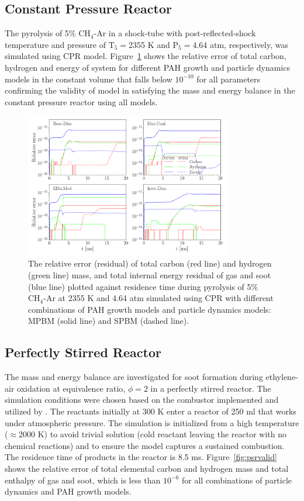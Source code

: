 \subsection{Constant Pressure Reactor}

The pyrolysis of 5\% $\mathrm{CH_4}$-Ar in a shock-tube with post-reflected-shock temperature and pressure of $\mathrm{T_5}=$2355 K and $\mathrm{P_5}=$4.64 atm, respectively, was simulated using CPR model. Figure~\ref{fig:cprvalid} shows the relative error of total carbon, hydrogen and energy of system for different PAH growth and particle dynamics models in the constant volume that falls below $\mathrm{10^{-10}}$ for all parameters confirming the validity of model in satisfying the mass and energy balance in the constant pressure reactor using all models.

\begin{figure}[H]
	\centering
	\includegraphics[width=0.8\textwidth]{Figures/Results/Validation/CPR/relerr_cpr.pdf}
	\caption{The relative error (residual) of total carbon (red line) and hydrogen (green line) mass, and total internal energy residual of gas and soot (blue line) plotted against residence time during pyrolysis of 5\% $\mathrm{CH_4}$-Ar at 2355 K and 4.64 atm simulated using CPR with different combinations of PAH growth models and particle dynamics models: MPBM (solid line) and SPBM (dashed line).}
	\label{fig:cprvalid}
\end{figure}

\subsection{Perfectly Stirred Reactor}
\label{sec:psrvalid}
The mass and energy balance are investigated for soot formation during ethylene-air oxidation at equivalence ratio, $\phi=2$ in a perfectly stirred reactor. The simulation conditions were chosen based on the combustor implemented and utilized by \citet{stouffer2002combustion}. The reactants initially at 300 K enter a reactor of 250 ml that works under atmospheric pressure. The simulation is initialized from a high temperature ($\approx$2000 K) to avoid trivial solution (cold reactant leaving the reactor with no chemical reactions) and to ensure the model captures a sustained combustion. The residence time of products in the reactor is 8.5 ms. Figure~\ref{fig:psrvalid} shows the relative error of total elemental carbon and hydrogen mass and total enthalpy of gas and soot, which is less than $10^{-6}$ for all combinations of particle dynamics and PAH growth models.

